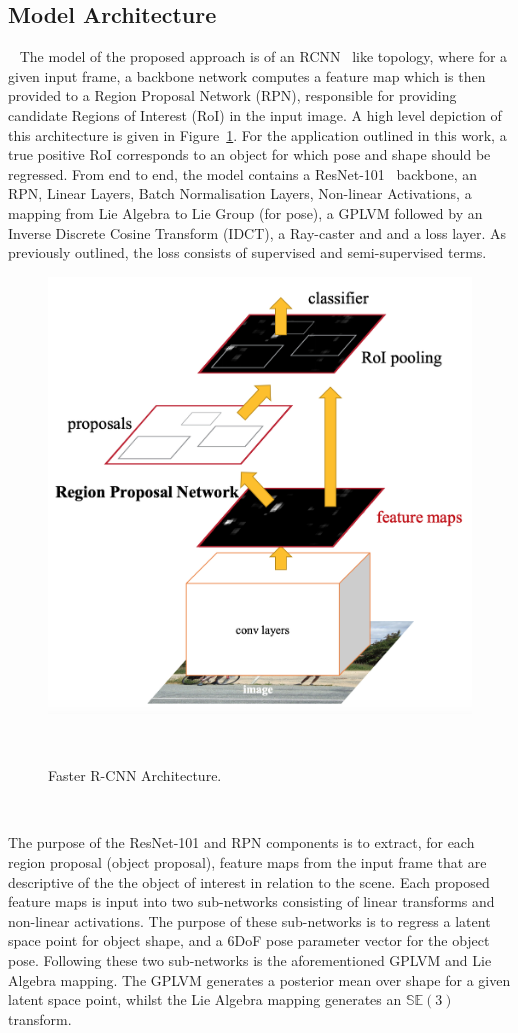 \subsection{Model Architecture}
~\label{subsec:spp_network_architecture}
The model of the proposed approach is of an RCNN~\cite{Girshick2014} like topology, where for a 
given input frame, a backbone network computes a feature map which is then provided to a Region 
Proposal Network (RPN), responsible for providing candidate Regions of Interest (RoI) in the input image. 
A high level depiction of this architecture is given in Figure~\ref{figure:spp_rcnn}.
For the application outlined in this work, a true positive RoI corresponds to an object for which pose and 
shape should be regressed. From end to end, the model contains a ResNet-101~\cite{He2015} backbone, an RPN,
Linear Layers, Batch Normalisation Layers, Non-linear Activations, a mapping from Lie Algebra to 
Lie Group (for pose), a GPLVM followed by an Inverse Discrete Cosine Transform (IDCT), a Ray-caster and 
and a loss layer. As previously outlined, the loss consists of supervised and semi-supervised terms.

\begin{figure}[!htbp]
  \centering
  \includegraphics[width=.4\linewidth]{figures/spp/rcnn.png}
  \caption[RCNN Architecture]{Faster R-CNN Architecture.\footnotemark}
~\label{figure:spp_rcnn}
\end{figure}
~

The purpose of the ResNet-101 and RPN components is to extract, for each region proposal (object proposal), 
feature maps from the input frame that are descriptive of the the object of interest in relation to the scene. 
Each proposed feature maps is input into two sub-networks consisting of linear transforms and non-linear activations. 
The purpose of these sub-networks is to regress a latent space point for object shape, and a 6DoF pose parameter vector 
for the object pose.  Following these two sub-networks is the aforementioned GPLVM and Lie Algebra mapping. The 
GPLVM generates a posterior mean over shape for a given latent space point, whilst the 
Lie Algebra mapping generates an \( \mathbb{SE}(3) \) transform. 

